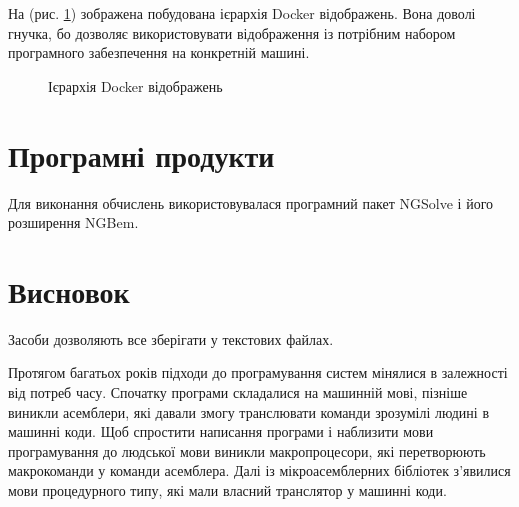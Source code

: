 На (рис. \ref{fig:software_docker_hierarchy}) зображена побудована ієрархія Docker відображень. Вона доволі гнучка, бо
дозволяє використовувати відображення із потрібним набором програмного забезпечення на конкретній машині.

\begin{figure}[ht!]
    \centering
    \caption{Ієрархія Docker відображень}
    \label{fig:software_docker_hierarchy}
\end{figure}


\section{Програмні продукти}

Для виконання обчислень використовувалася програмний пакет NGSolve \cite{software-ngsolve} і його розширення NGBem.

\section{Висновок}

Засоби дозволяють все зберігати у текстових файлах.


Протягом багатьох років підходи до програмування систем мінялися в залежності від потреб часу. Спочатку програми
складалися на машинній мові, пізніше виникли асемблери, які давали змогу транслювати команди зрозумілі людині в машинні
коди. Щоб спростити написання програми і наблизити мови програмування до людської мови виникли макропроцесори, які
перетворюють макрокоманди у команди асемблера. Далі із мікроасемблерних бібліотек з'явилися мови процедурного типу, які
мали власний транслятор у машинні коди.

